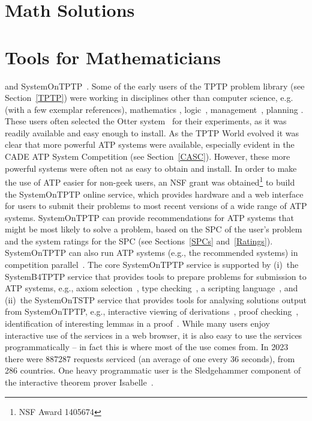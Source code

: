 \documentclass[runningheads]{llncs}
\begin{document}
\section{Math Solutions}
\label{MathSolutions}

\section{Tools for Mathematicians}
\label{Tools}

and SystemOnTPTP~\cite{Sut00-CADE-17}.
Some of the early users of the TPTP problem library (see Section~\ref{TPTP}) were working in
disciplines other than computer science, e.g. (with a few exemplar references), mathematics 
\cite{Qua92-Book,MP96}, logic~\cite{GO86,Jec95}, management~\cite{PB+92-TR,PM94}, planning 
\cite{SE94}.
These users often selected the Otter system~\cite{McC03-Otter} for their experiments, as
it was readily available and easy enough to install. 
As the TPTP World evolved it was clear that more powerful ATP systems were available, especially 
evident in the CADE ATP System Competition (see Section~\ref{CASC}).
However, these more powerful systems were often not as easy to obtain and install.
In order to make the use of ATP easier for non-geek users, an NSF grant was obtained\footnote{%
NSF Award 1405674} to build the SystemOnTPTP online service, which provides hardware and a web 
interface for users to submit their problems to most recent versions of a wide range of ATP 
systems.
SystemOnTPTP can provide recommendations for ATP systems that might be most likely to solve
a problem, based on the SPC of the user's problem and the system ratings for the SPC
(see Sections~\ref{SPCs} and~\ref{Ratings}). 
SystemOnTPTP can also run ATP systems (e.g., the recommended systems) in competition
parallel~\cite{SS99-FLAIRS}.
The core SystemOnTPTP service is supported by (i)~the SystemB4TPTP service that provides tools to
prepare problems for submission to ATP systems, e.g., axiom selection~\cite{HV11}, type 
checking~\cite{KSR16}, a scripting language~\cite{Sut14}, and (ii)~the SystemOnTSTP service that 
provides tools for analysing solutions output from SystemOnTPTP, 
e.g., interactive viewing of derivations~\cite{TPS07}, proof checking~\cite{Sut06}, identification 
of interesting lemmas in a proof~\cite{PGS06}.
While many users enjoy interactive use of the services in a web browser, it is also easy to use 
the services programmatically -- in fact this is where most of the use comes from.
In 2023 there were 887287 requests serviced (an average of one every 36 seconds), from 286 
countries.
One heavy programmatic user is the Sledgehammer component of the interactive theorem prover
Isabelle~\cite{PB10}.
\end{document}
